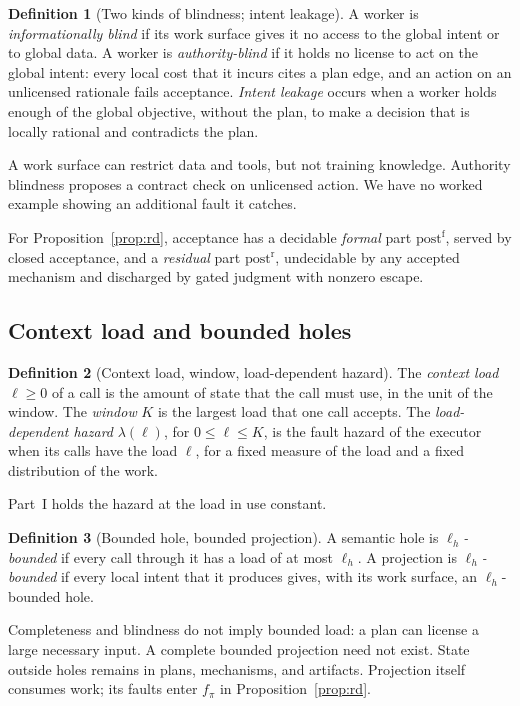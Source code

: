 \documentclass[11pt]{article}
\theoremstyle{definition}
\newtheorem{definition}{Definition}
\theoremstyle{remark}
\newcommand{\postf}{\mathrm{post}^{\mathrm{f}}}
\newcommand{\postr}{\mathrm{post}^{\mathrm{r}}}
\newcommand{\lh}{\ell_h}
\begin{document}
\begin{definition}[Two kinds of blindness; intent leakage]\label{def:blind}
A worker is \emph{informationally blind} if its work surface gives it no access to the global intent
or to global data. A worker is \emph{authority-blind} if it holds no license to act on the global
intent: every local cost that it incurs cites a plan edge, and an action on an unlicensed rationale
fails acceptance. \emph{Intent leakage} occurs when a worker holds enough of the global objective,
without the plan, to make a decision that is locally rational and contradicts the plan.
\end{definition}
A work surface can restrict data and tools, but not training knowledge.
Authority blindness proposes a contract check on unlicensed action.
We have no worked example showing an additional fault it catches.

For Proposition~\ref{prop:rd}, acceptance has a decidable \emph{formal} part $\postf$, served by
closed acceptance, and a \emph{residual} part $\postr$, undecidable by any accepted mechanism and
discharged by gated judgment with nonzero escape.

\subsection{Context load and bounded holes}\label{sec:load}
\begin{definition}[Context load, window, load-dependent hazard]\label{def:load}
The \emph{context load} $\ell\ge0$ of a call is the amount of state that the call must use, in the
unit of the window. The \emph{window} $K$ is the largest load that one call accepts. The \emph{load-dependent hazard} $\lambda(\ell)$, for $0\le\ell\le K$, is the fault hazard of the executor
when its calls have the load $\ell$, for a fixed measure of the load and a fixed distribution of the
work.
\end{definition}
Part~I holds the hazard at the load in use constant.

\begin{definition}[Bounded hole, bounded projection]\label{def:bounded}
A semantic hole is \emph{$\lh$-bounded} if every call through it has a load of at most $\lh$. A
projection is \emph{$\lh$-bounded} if every local intent that it produces gives, with its work
surface, an $\lh$-bounded hole.
\end{definition}
Completeness and blindness do not imply bounded load: a plan can license a large necessary input.
A complete bounded projection need not exist.
State outside holes remains in plans, mechanisms, and artifacts.
Projection itself consumes work; its faults enter $f_\pi$ in Proposition~\ref{prop:rd}.
\end{document}
